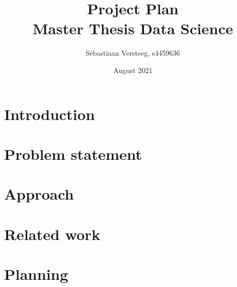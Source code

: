 \documentclass{article}
\title{Project Plan \\ \large{Master Thesis Data Science}}
\author{S\'ebastiaan Versteeg, s4459636}
\date{August 2021}
\begin{document}
\maketitle

\section{Introduction}

\section{Problem statement}

\section{Approach}

\section{Related work}

\section{Planning}
\end{document}

